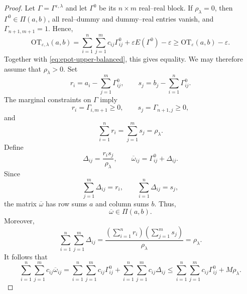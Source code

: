 \documentclass[a4paper,11pt]{article}
\numberwithin{equation}{section}
\newcommand{\eps}{\varepsilon}
\newcommand{\OT}{\mathrm{OT}}
\begin{document}
\begin{proof}
Let $\Gamma=\Gamma^{\eps,\lambda}$ and let $\Gamma^0$ be its $n\times m$ real--real block. If $\rho_{\lambda}=0$, then $\Gamma^0\in\Pi(a,b)$, all real--dummy and dummy--real entries vanish, and $\Gamma_{n+1,m+1}=1$. Hence,
\begin{equation*}
  \OT_{\eps,\lambda}(a,b) = \sum_{i = 1}^{n}\sum_{j = 1}^{m}c_{ij}\Gamma^0_{ij} + \eps E(\Gamma^0)-\eps \geq \OT_{\eps}(a,b)-\eps.
\end{equation*}
Together with \eqref{eq:epot-upper-balanced}, this gives equality. We may therefore assume that $\rho_{\lambda}>0$.
Set
\begin{equation*}
  r_i=a_i-\sum_{j=1}^{m}\Gamma^0_{ij},\qquad s_j=b_j-\sum_{i=1}^{n}\Gamma^0_{ij}.
\end{equation*}
The marginal constraints on $\Gamma$ imply
\begin{equation*}
  r_i=\Gamma_{i,m+1}\geq0,\qquad s_j=\Gamma_{n+1,j}\geq0,
\end{equation*}
and
\begin{equation*}
  \sum_{i=1}^{n}r_i=\sum_{j=1}^{m}s_j=\rho_{\lambda}.
\end{equation*}
Define
\begin{equation*}
  \Delta_{ij}=\frac{r_i s_j}{\rho_{\lambda}},\qquad \overline\omega_{ij}=\Gamma^0_{ij}+\Delta_{ij}.
\end{equation*}
Since
\begin{equation*}
  \sum_{j=1}^{m}\Delta_{ij}=r_i,\qquad \sum_{i=1}^{n}\Delta_{ij}=s_j,
\end{equation*}
the matrix $\overline\omega$ has row sums $a$ and column sums $b$. Thus,
\begin{equation*}
  \overline\omega\in\Pi(a,b).
\end{equation*}
Moreover,
\begin{equation*}
  \sum_{i = 1}^{n}\sum_{j = 1}^{m}\Delta_{ij} = \frac{\left(\sum_{i = 1}^{n}r_i\right)\left(\sum_{j = 1}^{m}s_j\right)}{\rho_{\lambda}} = \rho_{\lambda}.
\end{equation*}
It follows that
\begin{equation}\label{eq:value-cost-estimate}
  \sum_{i = 1}^{n}\sum_{j = 1}^{m}c_{ij}\overline\omega_{ij} = \sum_{i = 1}^{n}\sum_{j = 1}^{m}c_{ij}\Gamma^0_{ij} + \sum_{i = 1}^{n}\sum_{j = 1}^{m}c_{ij}\Delta_{ij} \leq \sum_{i = 1}^{n}\sum_{j = 1}^{m}c_{ij}\Gamma^0_{ij} + M\rho_{\lambda}.
\end{equation}


\end{proof}
\end{document}
